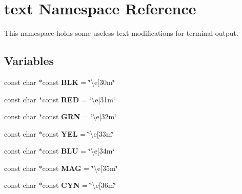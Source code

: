 \hypertarget{namespacetext}{}\section{text Namespace Reference}
\label{namespacetext}


This namespace holds some useless text modifications for terminal output.  


\subsection*{Variables}
\begin{DoxyCompactItemize}
\item 
\mbox{\label{namespacetext_a4fa213f28668cba2af5bde1d3d7904df}} 
const char $\ast$const {\bfseries B\+LK} = \char`\"{}\textbackslash{}e\mbox{[}30m\char`\"{}
\item 
\mbox{\label{namespacetext_ac2e454d781dce06ac89c972d0f999fb8}} 
const char $\ast$const {\bfseries R\+ED} = \char`\"{}\textbackslash{}e\mbox{[}31m\char`\"{}
\item 
\mbox{\label{namespacetext_a6c5120d8850011f6cb2c121366feb6e4}} 
const char $\ast$const {\bfseries G\+RN} = \char`\"{}\textbackslash{}e\mbox{[}32m\char`\"{}
\item 
\mbox{\label{namespacetext_af5249403cb35818689a627c7ef57fae8}} 
const char $\ast$const {\bfseries Y\+EL} = \char`\"{}\textbackslash{}e\mbox{[}33m\char`\"{}
\item 
\mbox{\label{namespacetext_a84534480435c2964850e8fefad365754}} 
const char $\ast$const {\bfseries B\+LU} = \char`\"{}\textbackslash{}e\mbox{[}34m\char`\"{}
\item 
\mbox{\label{namespacetext_ad29616145caa863968fc139e20aac10d}} 
const char $\ast$const {\bfseries M\+AG} = \char`\"{}\textbackslash{}e\mbox{[}35m\char`\"{}
\item 
\mbox{\label{namespacetext_a5b68a851d3702a1c5589b552b0fd9bf8}} 
const char $\ast$const {\bfseries C\+YN} = \char`\"{}\textbackslash{}e\mbox{[}36m\char`\"{}
\item 
\mbox{\label{namespacetext_ad2a49861a124ccdf50f7fc852c323552}} 

\end{DoxyCompactItemize}
